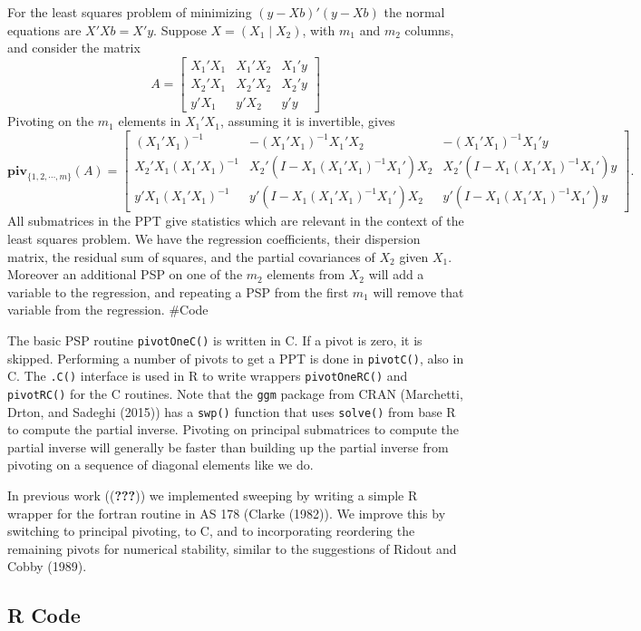 \documentclass[12pt,]{article}
\begin{document}
For the least squares problem of minimizing \((y-Xb)'(y-Xb)\) the normal
equations are \(X'Xb=X'y\). Suppose \(X=(X_1\mid X_2)\), with \(m_1\)
and \(m_2\) columns, and consider the matrix \[
A=\begin{bmatrix}
X_1'X_1&X_1'X_2&X_1'y\\
X_2'X_1&X_2'X_2&X_2'y\\
y'X_1&y'X_2&y'y
\end{bmatrix}
\] Pivoting on the \(m_1\) elements in \(X_1'X_1\), assuming it is
invertible, gives \[
\mathbf{piv}_{\{1,2,\cdots,m\}}(A)=
\begin{bmatrix}
(X_1'X_1)^{-1}&-(X_1'X_1)^{-1}X_1'X_2&-(X_1'X_1)^{-1}X_1'y\\
X_2'X_1(X_1'X_1)^{-1}&X_2'(I-X_1(X_1'X_1)^{-1}X_1')X_2&X_2'(I-X_1(X_1'X_1)^{-1}X_1')y\\
y'X_1(X_1'X_1)^{-1}&y'(I-X_1(X_1'X_1)^{-1}X_1')X_2&y'(I-X_1(X_1'X_1)^{-1}X_1')y
\end{bmatrix}.
\] All submatrices in the PPT give statistics which are relevant in the
context of the least squares problem. We have the regression
coefficients, their dispersion matrix, the residual sum of squares, and
the partial covariances of \(X_2\) given \(X_1\). Moreover an additional
PSP on one of the \(m_2\) elements from \(X_2\) will add a variable to
the regression, and repeating a PSP from the first \(m_1\) will remove
that variable from the regression. \#Code

The basic PSP routine \texttt{pivotOneC()} is written in C. If a pivot
is zero, it is skipped. Performing a number of pivots to get a PPT is
done in \texttt{pivotC()}, also in C. The \texttt{.C()} interface is
used in R to write wrappers \texttt{pivotOneRC()} and \texttt{pivotRC()}
for the C routines. Note that the \texttt{ggm} package from CRAN
(Marchetti, Drton, and Sadeghi (2015)) has a \texttt{swp()} function
that uses \texttt{solve()} from base R to compute the partial inverse.
Pivoting on principal submatrices to compute the partial inverse will
generally be faster than building up the partial inverse from pivoting
on a sequence of diagonal elements like we do.

In previous work (({\textbf{???}})) we implemented sweeping by writing a
simple R wrapper for the fortran routine in AS 178 (Clarke (1982)). We
improve this by switching to principal pivoting, to C, and to
incorporating reordering the remaining pivots for numerical stability,
similar to the suggestions of Ridout and Cobby (1989).

\subsection{R Code}\label{r-code}
\end{document}
